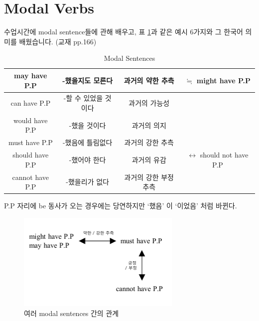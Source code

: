\documentclass[10pt]{report}
\begin{document}
	\section{Modal Verbs}%
	수업시간에 modal sentence들에 관해 배우고, 표 \ref{modal_table}과 같은 예시 6가지와 그 한국어 의미를 배웠습니다. (교재 pp.166)
	\begin{table}[ht]
		\centering
		\begin{tabular}{c||c|c|c}
			\hline
			may have P.P & -했을지도 모른다 & 과거의 약한 추측 & $\fallingdotseq$ might have P.P\\
			\hline
			can have P.P & -할 수 있었을 것이다 & 과거의 가능성 & \\
			\hline
			would have P.P & -했을 것이다 & 과거의 의지 & \\
			\hline
			must have P.P & -했음에 틀림없다 & 과거의 강한 추측 & \\
			\hline
			should have P.P & -했어야 한다 & 과거의 유감 & $\longleftrightarrow$ should not have P.P \\
			\hline
			cannot have P.P & -했을리가 없다 & 과거의 강한 부정추측 & \\
			\hline
		\end{tabular}
		\caption{Modal Sentences}
		\label{modal_table}
	\end{table}
	P.P 자리에 be 동사가 오는 경우에는 당연하지만  `했음' 이 `이었음' 처럼 바뀐다.
	\begin{figure}[ht]
		\centering
		\includegraphics[width=0.7\textwidth]{modal.pdf}
		\caption{여러 modal sentences 간의 관계}
		\label{modal_relation}
	\end{figure}
	
\end{document}
